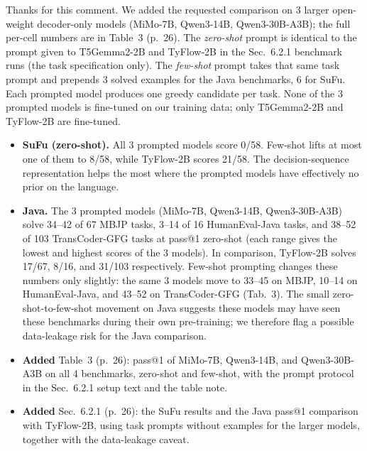 \documentclass[11pt,a4paper]{article}
\newcommand{\response}{\par\medskip\needspace{3\baselineskip}\noindent{\bfseries\color{accent}Response.}%
  \par\nopagebreak\smallskip\ignorespaces}
\newcommand{\changesmade}[1]{\par\medskip\needspace{4\baselineskip}\noindent{\bfseries\color{accent}Changes made.}%
  \par\nopagebreak\smallskip#1\par}
\begin{document}
\response Thanks for this comment. We added the requested comparison on 3 larger open-weight decoder-only models (MiMo-7B, Qwen3-14B, Qwen3-30B-A3B); the full per-cell numbers are in Table~3 (p.~26). 
The \emph{zero-shot} prompt is identical to the prompt given to T5Gemma2-2B and TyFlow-2B in the Sec.~6.2.1 benchmark runs (the task specification only). The \emph{few-shot} prompt takes that same task prompt and prepends 3 solved examples for the Java benchmarks, 6 for SuFu. Each prompted model produces one greedy candidate per task. None of the 3 prompted models is fine-tuned on our training data; only T5Gemma2-2B and TyFlow-2B are fine-tuned.

\begin{itemize}[leftmargin=1.4em]
  \item \textbf{SuFu (zero-shot).} All 3 prompted models score 0/58. Few-shot lifts at most one of them to 8/58, while TyFlow-2B scores 21/58. The decision-sequence representation helps the most where the prompted models have effectively no prior on the language.
  \item \textbf{Java.} The 3 prompted models (MiMo-7B, Qwen3-14B, Qwen3-30B-A3B) solve 34--42 of 67 MBJP tasks, 3--14 of 16 HumanEval-Java tasks, and 38--52 of 103 TransCoder-GFG tasks at pass@1 zero-shot (each range gives the lowest and highest scores of the 3 models). In comparison, TyFlow-2B solves 17/67, 8/16, and 31/103 respectively. 
  Few-shot prompting changes these numbers only slightly: the same 3 models move to 33--45 on MBJP, 10--14 on HumanEval-Java, and 43--52 on TransCoder-GFG (Tab.~3). The small zero-shot-to-few-shot movement on Java suggests these models may have seen these benchmarks during their own pre-training; we therefore flag a possible data-leakage risk for the Java comparison.
\end{itemize}

\changesmade{\begin{itemize}[leftmargin=1.2em,itemsep=1pt,topsep=2pt]
  \item \textbf{Added} Table~3 (p.~26): pass@1 of MiMo-7B, Qwen3-14B, and Qwen3-30B-A3B on all 4 benchmarks, zero-shot and few-shot, with the prompt protocol in the Sec.~6.2.1 setup text and the table note.
  \item \textbf{Added} Sec.~6.2.1 (p.~26): the SuFu results and the Java pass@1 comparison with TyFlow-2B, using task prompts without examples for the larger models, together with the data-leakage caveat.
\end{itemize}}
\end{document}
